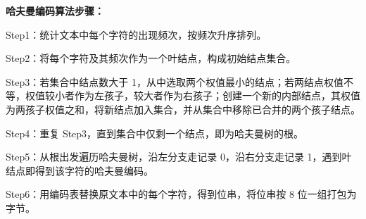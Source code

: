 \noindent\textbf{哈夫曼编码算法步骤：}\par
\noindent\hspace*{2em}Step1：统计文本中每个字符的出现频次，按频次升序排列。\par
\noindent\hspace*{2em}Step2：将每个字符及其频次作为一个叶结点，构成初始结点集合。\par
\noindent\hspace*{2em}Step3：若集合中结点数大于 1，从中选取两个权值最小的结点；若两结点权值不等，权值较小者作为左孩子，较大者作为右孩子；创建一个新的内部结点，其权值为两孩子权值之和，将新结点加入集合，并从集合中移除已合并的两个孩子结点。\par
\noindent\hspace*{2em}Step4：重复 Step3，直到集合中仅剩一个结点，即为哈夫曼树的根。\par
\noindent\hspace*{2em}Step5：从根出发遍历哈夫曼树，沿左分支走记录 0，沿右分支走记录 1，遇到叶结点即得到该字符的哈夫曼编码。\par
\noindent\hspace*{2em}Step6：用编码表替换原文本中的每个字符，得到位串，将位串按 8 位一组打包为字节。\par

